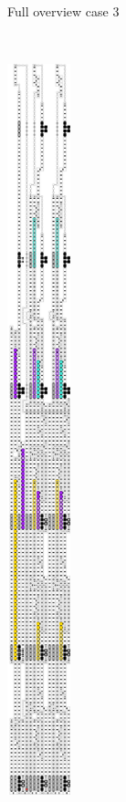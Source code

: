 \begin{figure}[H]
\begin{subfigure}[t]{0.2\textwidth}
            \caption{\label{fig:full_overview_case3_colored} Full overview case 3}
        \end{subfigure}%
        ~
        \begin{subfigure}[t]{0.2\textwidth}
            \centering
            \includegraphics[width=0.2\textwidth]{full_overview_case2_colored}

\end{subfigure}
\end{figure}
